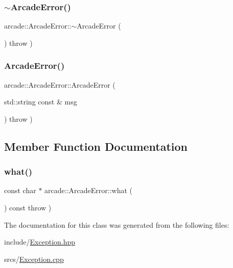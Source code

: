 \subsubsection{\texorpdfstring{$\sim$\+Arcade\+Error()}{~ArcadeError()}}
{\footnotesize\ttfamily arcade\+::\+Arcade\+Error\+::$\sim$\+Arcade\+Error (\begin{DoxyParamCaption}{ }\end{DoxyParamCaption}) throw  ) \hspace{0.3cm}{\ttfamily [virtual]}}

\mbox{\label{classarcade_1_1_arcade_error_ab8c1d2196492a10bb07177d1c5187322}} 
\subsubsection{\texorpdfstring{Arcade\+Error()}{ArcadeError()}}
{\footnotesize\ttfamily arcade\+::\+Arcade\+Error\+::\+Arcade\+Error (\begin{DoxyParamCaption}\item[{std\+::string const \&}]{msg }\end{DoxyParamCaption}) throw  ) }



\subsection{Member Function Documentation}
\mbox{\label{classarcade_1_1_arcade_error_a48642ed78360efee13b4f1e343035f4e}} 
\subsubsection{\texorpdfstring{what()}{what()}}
{\footnotesize\ttfamily const char $\ast$ arcade\+::\+Arcade\+Error\+::what (\begin{DoxyParamCaption}{ }\end{DoxyParamCaption}) const throw  ) \hspace{0.3cm}{\ttfamily [virtual]}}



The documentation for this class was generated from the following files\+:\begin{DoxyCompactItemize}
\item 
include/\hyperlink{_exception_8hpp}{Exception.\+hpp}\item 
srcs/\hyperlink{_exception_8cpp}{Exception.\+cpp}\end{DoxyCompactItemize}
